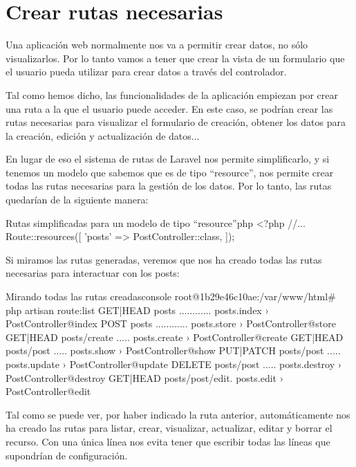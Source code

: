 \chapter{Crear rutas necesarias}

Una aplicación web normalmente nos va a permitir crear datos, no sólo visualizarlos. Por lo tanto vamos a tener que crear la vista de un formulario que el usuario pueda utilizar para crear datos a través del controlador.

Tal como hemos dicho, las funcionalidades de la aplicación empiezan por crear una ruta a la que el usuario puede acceder. En este caso, se podrían crear las rutas necesarias para visualizar el formulario de creación, obtener los datos para la creación, edición y actualización de datos...

En lugar de eso el sistema de rutas de Laravel nos permite simplificarlo, y si tenemos un modelo que sabemos que es de tipo “resource”, nos permite crear todas las rutas necesarias para la gestión de los datos. Por lo tanto, las rutas quedarían de la siguiente manera:

\begin{mycode}{Rutas simplificadas para un modelo de tipo “resource”}{php}{}
<?php
//...
Route::resources([
    'posts' => PostController::class,
]);
\end{mycode}

Si miramos las rutas generadas, veremos que nos ha creado todas las rutas necesarias para interactuar con los posts:

\begin{mycode}{Mirando todas las rutas creadas}{console}{}
root@1b29e46c10ae:/var/www/html# php artisan route:list
GET|HEAD   posts ............ posts.index › PostController@index
POST       posts ............ posts.store › PostController@store
GET|HEAD   posts/create ..... posts.create › PostController@create
GET|HEAD   posts/{post} ..... posts.show › PostController@show
PUT|PATCH  posts/{post} ..... posts.update › PostController@update
DELETE     posts/{post} ..... posts.destroy › PostController@destroy
GET|HEAD    posts/{post}/edit. posts.edit › PostController@edit
\end{mycode}

Tal como se puede ver, por haber indicado la ruta anterior, automáticamente nos ha creado las rutas para listar, crear, visualizar, actualizar, editar y borrar el recurso. Con una única línea nos evita tener que escribir todas las líneas que supondrían de configuración.



